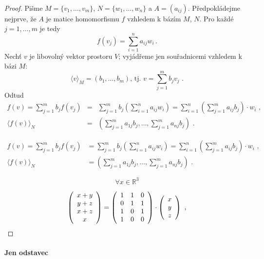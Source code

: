 \documentclass{article}
\theoremstyle{plain}
\begin{document}
\begin{proof}
Pišme $M=\{v_1, \dots, v_m\}$, $N = \{w_1, \dots, w_n\}$ a $A=(a_{i j})$. Před\-po\-klá\-dej\-me nejprve, že $A$ je matice homomorfismu  $f$ vzhledem k bázím $M$, $N$. Pro každé $j=1, \dots, m$ je tedy
$$
f(v_j) = \sum_{i=1}^n a_{ij}w_i \,.
$$
Nechť $v$ je libovolný vektor prostoru $V$; vyjádřeme jen souřadnicemi vzhledem k bázi $M$:
$$
\langle v \rangle_M = (b_1, \dots, b_m) \text{, tj. } v = \sum_{j=1}^m b_j v_j \text{ .}
$$
Odtud
\begin{eqnarray}
f(v) = \sum_{j=1}^m b_j f(v_j) &=&\sum_{j=1}^m b_j \left(\sum_{i=1}^n a_{ij}w_i \right) = \sum_{i=1}^n \left(  \sum_{j=1}^m a_{ij}b_j \right) \cdot w_i \text{ ,} \label{eqn:druha}\\
\langle f(v) \rangle_N &=& \left( \sum_{j=1}^m a_{1j}b_j, \dots, \sum_{j=1}^m a_{nj}b_j \right) \text{ .} \label{eqn:treti}
\end{eqnarray}

\begin{align*}
f(v) = \sum_{j=1}^m b_j f(v_j) &=\sum_{j=1}^m b_j \left(\sum_{i=1}^n a_{ij}w_i \right) = \sum_{i=1}^n \left(  \sum_{j=1}^m a_{ij}b_j \right) \cdot w_i \text{ ,} \\
\langle f(v) \rangle_N &= \left( \sum_{j=1}^m a_{1j}b_j, \dots, \sum_{j=1}^m a_{nj}b_j \right) \text{ .} 
\end{align*}

$$ \forall x \in \mathbb{R}^3$$

$$\left( \begin{array}{c} x+y  \\ y+z \\ x+z \\ x \end{array}\right) =
     \left( \begin{array}{*{3}c} 1 & 1 & 0\\ 0 & 1 & 1 \\ 1 & 0 & 1 \\ 1 & 0 & 0 \end{array}\right) 
     \cdot  \left( \begin{array}{c}  x \\ y \\ z \end{array}\right) \text{ ,}$$

\end{proof}

\paragraph{Jen odstavec}
\blindtext
\end{document}

